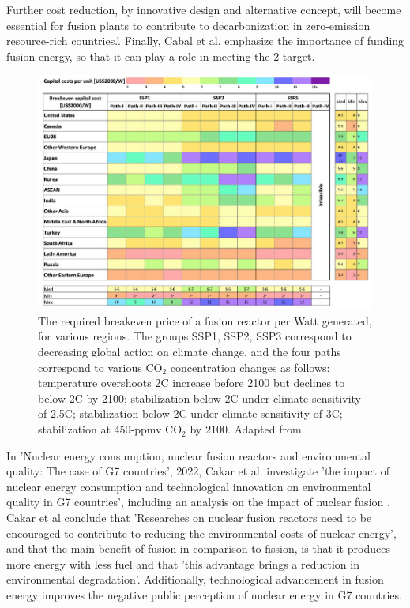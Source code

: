 Further cost reduction, by innovative design and alternative concept, will become essential for fusion plants to contribute to decarbonization in zero-emission resource-rich countries.'. Finally, Cabal et al. emphasize the importance of funding fusion energy, so that it can play a role in meeting the 2 target.


\begin{figure}[h!]
    \centering
    \includegraphics[width =0.65\linewidth]{SubreportFigures/breakeven_by_nation_co2.pdf}
    \caption{ The required breakeven price of a fusion reactor per Watt generated, for various regions. The groups SSP1, SSP2, SSP3 correspond to decreasing global action on climate change, and the four paths correspond to various CO$_2$ concentration changes as follows: temperature overshoots 2\degree C increase before 2100 but declines to below 2\degree C by 2100; stabilization below 2\degree C under climate sensitivity of 2.5\degree C;  stabilization below 2\degree C under climate sensitivity of 3\degree C; stabilization at 450-ppmv CO$_2$ by 2100. Adapted from \cite{gi2020potential}. }
    \label{fig:breakeven}
\end{figure}

In 'Nuclear energy consumption, nuclear fusion reactors and environmental quality: The case of G7 countries', 2022, Cakar et al. investigate 'the impact of nuclear energy consumption and technological innovation on environmental quality in G7 countries', including an analysis on the impact of nuclear fusion \cite{ccakar2022nuclear}. Cakar et al conclude that 'Researches on nuclear fusion reactors need to be encouraged to contribute to reducing the environmental costs of nuclear
energy', and that the main benefit of fusion in comparison to fission, is that it produces more energy with less fuel and that 'this advantage brings a reduction in environmental degradation'. Additionally, technological advancement in fusion energy improves the negative public perception of nuclear energy in G7 countries.


